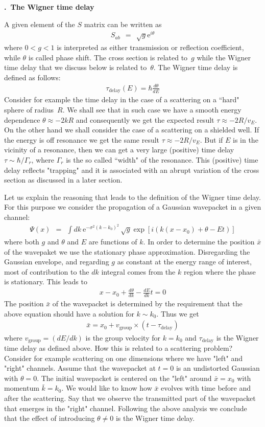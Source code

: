 \documentclass[onecolumn,fleqn, 11pt]{revtex4}
\newcommand{\eexp}{\mathrm{e}^}
\newcommand{\tbox}[1]{\text{#1}}
\newcommand{\beq}{\begin{eqnarray}}
\newcommand{\eeq}{\end{eqnarray}}
\renewcommand{\thesubsection}{\arabic{subsection}}
\renewcommand{\thesubsubsection}{\arabic{subsubsection}}
\newcommand{\sheadC}[1]
{
\addtocounter{subsubsection}{1}
\vspace{5mm}
{\bf \thesubsection.\thesubsubsection \ #1}  
\nopagebreak
\phantomsection
}
\begin{document}
\sheadC{The Wigner time delay} 


A given element of the $S$ matrix can be written as 
\beq 
S_{ab} \ \ = \ \ \sqrt{g}\eexp{i\theta}
\eeq
where $0<g<1$ is interpreted as either 
transmission or reflection coefficient, 
while $\theta$ is called phase shift.
The cross section is related to~$g$    
while the Wigner time delay that we discuss     
below is related to~$\theta$. 
The Wigner time delay is defined as follows: 
\beq 
\tau_{\tbox{delay}}(E) = \hbar\frac{d\theta}{dE} 
\eeq
Consider for example the time delay in the case 
of a scattering on a ``hard" sphere of radius~$R$. 
We shall see that in such case we have a smooth energy 
dependence $\theta \approx -2kR$ and consequently  
we get the expected result $\tau \approx -2R/v_E$.  
On the other hand we shall consider the case 
of a scattering on a shielded well. 
If the energy is off resonance we get 
the same result $\tau \approx -2R/v_E$. 
But if $E$ is in the vicinity of a resonance, 
then we can get a very large (positive) 
time delay $\tau \sim \hbar/\Gamma_r$, 
where $\Gamma_r$ is the so called ``width" 
of the resonance.  This (positive) time delay 
reflects "trapping" and it is associated 
with an abrupt variation of the cross section 
as discussed in a later section.



Let us explain the reasoning that leads 
to the definition of the Wigner time delay.
For this purpose we consider the propagation of 
a Gaussian wavepacket in a given channel: 
\beq
\Psi(x) \ \ = \ \ \int dk \ \eexp{-\sigma^2(k-k_0)^2} 
\, \sqrt{g}\exp\left[ i\left( k(x-x_0) + \theta - Et \right)\right]
\eeq 
where both $g$ and $\theta$ and $E$ are functions of $k$. 
In order to determine the position $\bar{x}$ of the wavepaket 
we use the stationary phase approximation.  
Disregarding the Gaussian envelope, and regarding $g$ 
as constant at the energy range of interest, 
most of contribution to the $dk$ integral comes from 
the $k$ region where the phase is stationary. This leads to 
\beq 
x-x_0 + \frac{d\theta}{dk} - \frac{dE}{dk}t = 0
\eeq 
The position $\bar{x}$ of the wavepacket is 
determined by the requirement that the above 
equation should have a solution for $k \sim k_0$. 
Thus we get
\beq 
\bar{x} = x_0  + v_{\tbox{group}} \times (t-\tau_{\tbox{delay}})
\eeq 
where $v_{\tbox{group}}=(dE/dk)$ is the group velocity 
for $k=k_0$ and $\tau_{\tbox{delay}}$ is the Wigner time 
delay as defined above. 
How this is related to a scattering problem?
Consider for example scattering on one dimensions 
where we have "left" and "right" channels.
Assume that the wavepacket at $t=0$ 
is an undistorted Gaussian with $\theta=0$. 
The initial wavepacket is centered on the "left" 
around $\bar{x}=x_0$ with momentum $\bar{k}=k_0$. 
We would like to know how  $\bar{x}$ evolves  
with time before and after the scattering. 
Say that we observe the transmitted part of 
the wavepacket that emerges in the "right" channel.
Following the above analysis we conclude that 
the effect of introducing $\theta \ne 0$ 
is the Wigner time delay.  
\end{document}
